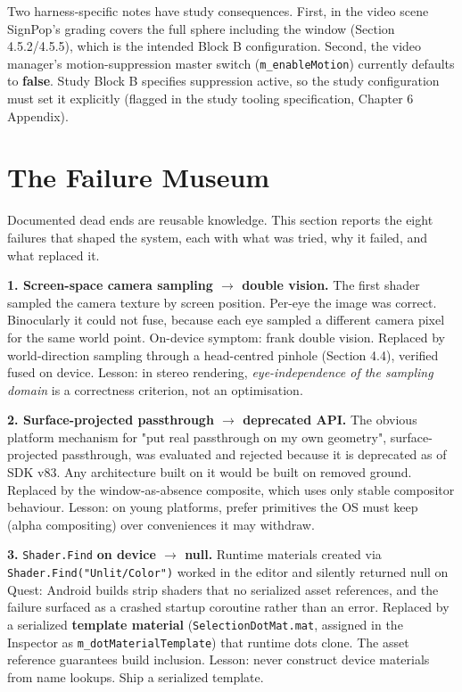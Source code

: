 Two harness-specific notes have study consequences. First, in the video scene SignPop's grading
covers the full sphere including the window (Section 4.5.2/4.5.5), which is the intended Block B
configuration. Second, the video manager's motion-suppression master switch (\verb|m_enableMotion|)
currently defaults to \textbf{false}. Study Block B specifies suppression active, so the study
configuration must set it explicitly (flagged in the study tooling specification, Chapter 6
Appendix).

\section{The Failure Museum}

Documented dead ends are reusable knowledge. This section reports the eight failures that shaped the
system, each with what was tried, why it failed, and what replaced it.

\textbf{1. Screen-space camera sampling $\rightarrow$ double vision.} The first shader sampled the camera texture by
screen position. Per-eye the image was correct. Binocularly it could not fuse, because each eye
sampled a different camera pixel for the same world point. On-device symptom: frank double vision.
Replaced by world-direction sampling through a head-centred pinhole (Section 4.4), verified fused on
device. Lesson: in stereo rendering, \textit{eye-independence of the sampling domain} is a correctness
criterion, not an optimisation.

\textbf{2. Surface-projected passthrough $\rightarrow$ deprecated API.} The obvious platform mechanism for "put real
passthrough on my own geometry", surface-projected passthrough, was evaluated and rejected because
it is deprecated as of SDK v83. Any architecture built on it would be built on removed ground.
Replaced by the window-as-absence composite, which uses only stable compositor behaviour. Lesson: on
young platforms, prefer primitives the OS must keep (alpha compositing) over conveniences it may
withdraw.

\textbf{3. }\verb|Shader.Find|\textbf{ on device $\rightarrow$ null.} Runtime materials created via \verb|Shader.Find("Unlit/Color")|
worked in the editor and silently returned null on Quest: Android builds strip shaders that no
serialized asset references, and the failure surfaced as a crashed startup coroutine rather than an
error. Replaced by a serialized \textbf{template material} (\verb|SelectionDotMat.mat|, assigned in the
Inspector as \verb|m_dotMaterialTemplate|) that runtime dots clone. The asset reference guarantees build
inclusion. Lesson: never construct device materials from name lookups. Ship a serialized template.

